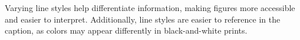 


\noindent Varying line styles help differentiate information, making figures more accessible and easier to interpret.
Additionally, line styles are easier to reference in the caption, as colors may appear differently in black-and-white prints.

